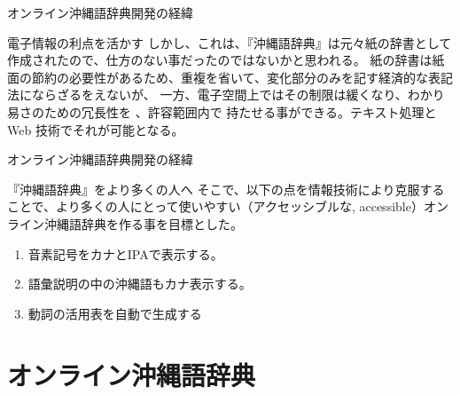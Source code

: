 \documentclass[14pt]{beamer}
\begin{document}
\begin{frame}{オンライン沖縄語辞典開発の経緯}
  \begin{block}{電子情報の利点を活かす}
    \vspace{0pt}
    しかし、これは、『沖縄語辞典』は元々紙の辞書として作成されたので、仕方のない事だったのではないかと思われる。
    紙の辞書は紙面の節約の必要性があるため、重複を省いて、変化部分のみを記す経済的な表記法にならざるをえないが、
    一方、電子空間上ではその制限は緩くなり、わかり易さのための冗長性を 、許容範囲内で 持たせる事ができる。テキスト処理と Web 技術でそれが可能となる。
  \end{block}
\end{frame}

\begin{frame}{オンライン沖縄語辞典開発の経緯}
  \begin{block}{『沖縄語辞典』をより多くの人へ}
    \vspace{0pt}
    そこで、以下の点を情報技術により克服することで、より多くの人にとって使いやすい（アクセッシブルな, accessible）オンライン沖縄語辞典を作る事を目標とした。
    \begin{enumerate}
    \item 音素記号をカナとIPAで表示する。
    \item 語彙説明の中の沖縄語もカナ表示する。
    \item 動詞の活用表を自動で生成する
    \end{enumerate}
  \end{block}
\end{frame}

\section{オンライン沖縄語辞典}

\end{document}
